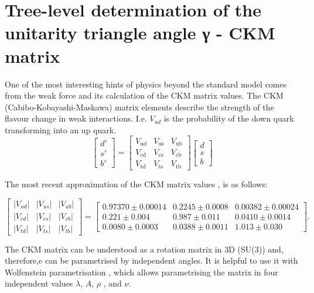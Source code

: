 \section{Tree-level determination of the unitarity triangle angle γ - CKM matrix}

One of the most interesting hints of physics beyond the standard model comes from the weak force and its calculation of the CKM matrix values. The CKM (Cabibo-Kobayashi-Maskawa) matrix elements describe the strength of the flavour change in weak interactions. I.e. $V_{ud}$ is the probability of the down quark transforming into an up quark.
$$
\begin{bmatrix}  d'  \\  s'  \\  b'  \end{bmatrix} = \begin{bmatrix} V_\mathrm{ud} & V_\mathrm{us} & V_\mathrm{ub} \\ V_\mathrm{cd} & V_\mathrm{cs} & V_\mathrm{cb} \\ V_\mathrm{td} & V_\mathrm{ts} & V_\mathrm{tb} \end{bmatrix} \begin{bmatrix}  d  \\  s  \\  b  \end{bmatrix}
$$

The most recent approximation of the CKM matrix values \cite{10.1093/ptep/ptaa104}, is as follows:

$$
\begin{bmatrix}
|V_{ud}| & |V_{us}| & |V_{ub}| \\
|V_{cd}| & |V_{cs}| & |V_{cb}| \\
|V_{td}| & |V_{ts}| & |V_{tb}|
\end{bmatrix} = \begin{bmatrix}
0.97370 \pm 0.00014 & 0.2245 \pm 0.0008 & 0.00382 \pm 0.00024 \\
0.221 \pm 0.004 & 0.987 \pm 0.011 & 0.0410 \pm 0.0014 \\
0.0080 \pm 0.0003 & 0.0388 \pm 0.0011  & 1.013 \pm 0.030
\end{bmatrix}.
$$


The CKM matrix can be understood as a rotation matrix in 3D (SU(3)) and, therefore,e can be parametrised by independent angles.
It is helpful to use it with Wolfenstein parametrisation \cite{PhysRevLett.51.1945}, which allows parametrising the matrix in four independent values $\lambda$, $A$, $\rho$ , and $\nu$.

